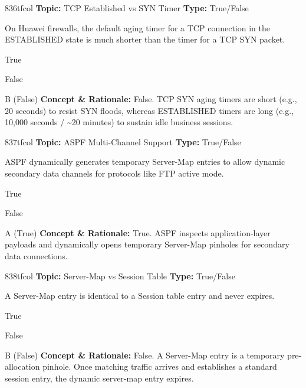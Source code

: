 \begin{qcard}{836}{tfcol}
\textcolor{darkslate!75}{\small\textbf{Topic:} TCP Established vs SYN Timer \hfill \textbf{Type:} True/False}\vspace{0.4em}\par
On Huawei firewalls, the default aging timer for a TCP connection in the ESTABLISHED state is much shorter than the timer for a TCP SYN packet.
\begin{qoptions}
\item True
\item False
\end{qoptions}
\end{qcard}
\nopagebreak
\begin{explainbox}{B (False)}
\textbf{Concept \& Rationale:} False. TCP SYN aging timers are short (e.g., 20 seconds) to resist SYN floods, whereas ESTABLISHED timers are long (e.g., 10,000 seconds / \textasciitilde{}20 minutes) to sustain idle business sessions.
\end{explainbox}

\begin{qcard}{837}{tfcol}
\textcolor{darkslate!75}{\small\textbf{Topic:} ASPF Multi-Channel Support \hfill \textbf{Type:} True/False}\vspace{0.4em}\par
ASPF dynamically generates temporary Server-Map entries to allow dynamic secondary data channels for protocols like FTP active mode.
\begin{qoptions}
\item True
\item False
\end{qoptions}
\end{qcard}
\nopagebreak
\begin{explainbox}{A (True)}
\textbf{Concept \& Rationale:} True. ASPF inspects application-layer payloads and dynamically opens temporary Server-Map pinholes for secondary data connections.
\end{explainbox}

\begin{qcard}{838}{tfcol}
\textcolor{darkslate!75}{\small\textbf{Topic:} Server-Map vs Session Table \hfill \textbf{Type:} True/False}\vspace{0.4em}\par
A Server-Map entry is identical to a Session table entry and never expires.
\begin{qoptions}
\item True
\item False
\end{qoptions}
\end{qcard}
\nopagebreak
\begin{explainbox}{B (False)}
\textbf{Concept \& Rationale:} False. A Server-Map entry is a temporary pre-allocation pinhole. Once matching traffic arrives and establishes a standard session entry, the dynamic server-map entry expires.
\end{explainbox}

